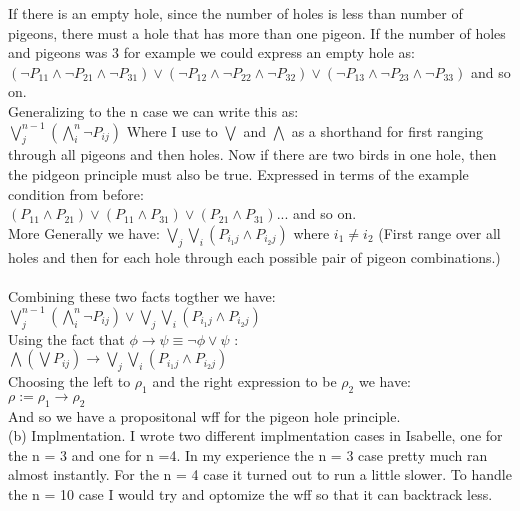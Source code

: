 \documentclass[11pt,leqno,fleqn]{article}
\begin{document}
If there is an empty hole, since the number of holes is less than number of pigeons, there must a hole that has more than one pigeon.
If the number of holes and pigeons was 3 for example we could express an empty hole as: 
$(\neg{P_{1 1} \land \neg P_{21} \land \neg P_{31}}) \lor (\neg{P_{1 2} \land \neg P_{22} \land \neg P_{32}})  \lor (\neg{P_{1 3} \land \neg P_{23} \land \neg P_{33}})$ and so on.\\
Generalizing to the n case we can write this as:\\
$\bigvee_{j}^{n-1} (\bigwedge_{i}^n \neg{P_{ij}})  $ Where I use to $\bigvee$ and $\bigwedge$ as a shorthand for first ranging through all pigeons and then holes. 
Now if there are two birds in one hole, then the pidgeon principle must also be true. Expressed in terms of the example condition from before:\\
$(P_{11} \land P_{21}) \lor (P_{11} \land P_{31}) \lor (P_{21} \land P_{31}) ...$ and so on.\\
More Generally we have: $\bigvee_j \bigvee_i (P_{i_1 j} \land P_{i_2 j})$ where $i_1 \neq i_2$ (First range over all holes and then for each hole through each possible pair of pigeon combinations.)\\
\\
Combining these two facts togther we have: \\
 $\bigvee_{j}^{n-1} (\bigwedge_{i}^n \neg{P_{ij}})  \lor  \bigvee_j \bigvee_i (P_{i_1 j} \land P_{i_2 j})$\\
 Using the fact that $\phi \to \psi \equiv \neg{\phi} \lor \psi$ :\\
 $\bigwedge (\bigvee P_{ij}) \to  \bigvee_j \bigvee_i (P_{i_1 j} \land P_{i_2 j})$\\

 Choosing the left to $\rho_1$ and the right expression to be $\rho_2$ we have:\\
 $\rho := \rho_1 \to \rho_2 $\\
 And so we have a propositonal wff for the pigeon hole principle.\\
 
(b) Implmentation. I wrote two different implmentation cases in Isabelle, one for the n = 3 and one for n =4. 
In my experience the n = 3 case pretty much ran almost instantly. For the n = 4 case it turned out to run a little slower. To handle the n = 10 case I would try and optomize the wff so that it can backtrack less.
\end{document}
